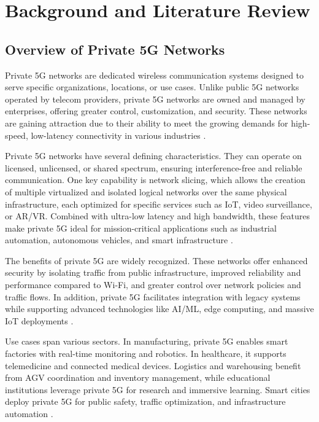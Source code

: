 \chapter{Background and Literature Review}
\label{ch:literature_review}

\section{Overview of Private 5G Networks}

Private 5G networks are dedicated wireless communication systems designed to serve specific organizations, locations, or use cases. Unlike public 5G networks operated by telecom providers, private 5G networks are owned and managed by enterprises, offering greater control, customization, and security. These networks are gaining attraction due to their ability to meet the growing demands for high-speed, low-latency connectivity in various industries \cite{private5g_trends}.

Private 5G networks have several defining characteristics. They can operate on licensed, unlicensed, or shared spectrum, ensuring interference-free and reliable communication. One key capability is network slicing, which allows the creation of multiple virtualized and isolated logical networks over the same physical infrastructure, each optimized for specific services such as IoT, video surveillance, or AR/VR. Combined with ultra-low latency and high bandwidth, these features make private 5G ideal for mission-critical applications such as industrial automation, autonomous vehicles, and smart infrastructure \cite{5g_architecture_overview}.

The benefits of private 5G are widely recognized. These networks offer enhanced security by isolating traffic from public infrastructure, improved reliability and performance compared to Wi-Fi, and greater control over network policies and traffic flows. In addition, private 5G facilitates integration with legacy systems while supporting advanced technologies like AI/ML, edge computing, and massive IoT deployments \cite{5g_enterprise_benefits}.

Use cases span various sectors. In manufacturing, private 5G enables smart factories with real-time monitoring and robotics. In healthcare, it supports telemedicine and connected medical devices. Logistics and warehousing benefit from AGV coordination and inventory management, while educational institutions leverage private 5G for research and immersive learning. Smart cities deploy private 5G for public safety, traffic optimization, and infrastructure automation \cite{5g_industry_applications}.

